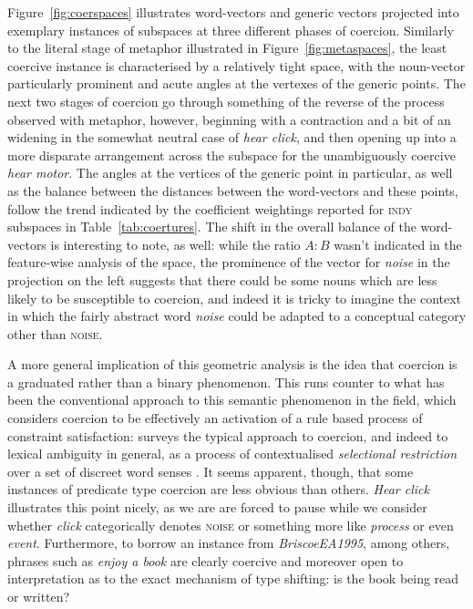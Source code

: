 Figure~\ref{fig:coerspaces} illustrates word-vectors and generic vectors projected into exemplary instances of subspaces at three different phases of coercion.  Similarly to the literal stage of metaphor illustrated in Figure~\ref{fig:metaspaces}, the least coercive instance is characterised by a relatively tight space, with the noun-vector particularly prominent and acute angles at the vertexes of the generic points.  The next two stages of coercion go through something of the reverse of the process observed with metaphor, however, beginning with a contraction and a bit of an widening in the somewhat neutral case of \emph{hear click}, and then opening up into a more disparate arrangement across the subspace for the unambiguously coercive \emph{hear motor}.  The angles at the vertices of the generic point in particular, as well as the balance between the distances between the word-vectors and these points, follow the trend indicated by the coefficient weightings reported for \textsc{indy} subspaces in Table~\ref{tab:coertures}.  The shift in the overall balance of the word-vectors is interesting to note, as well: while the ratio $A:B$ wasn't indicated in the feature-wise analysis of the space, the prominence of the vector for \emph{noise} in the projection on the left suggests that there could be some nouns which are less likely to be susceptible to coercion, and indeed it is tricky to imagine the context in which the fairly abstract word \emph{noise} could be adapted to a conceptual category other than \textsc{noise}.

A more general implication of this geometric analysis is the idea that coercion is a graduated rather than a binary phenomenon.  This runs counter to what has been the conventional approach to this semantic phenomenon in the field, which considers coercion to be effectively an activation of a rule based process of constraint satisfaction: \cite{Pustejovsky1993} surveys the typical approach to coercion, and indeed to lexical ambiguity in general, as a process of contextualised \emph{selectional restriction} over a set of discreet word senses \citep[though see][for computational applications of a probabilistic, corpus based model]{LapataEA2003,ShutovaEA2013b}.  It seems apparent, though, that some instances of predicate type coercion are less obvious than others.  \emph{Hear click} illustrates this point nicely, as we are are forced to pause while we consider whether \emph{click} categorically denotes \textsc{noise} or something more like \emph{process} or even \emph{event}.  Furthermore, to borrow an instance from \emph{BriscoeEA1995}, among others, phrases such as \emph{enjoy a book} are clearly coercive and moreover open to interpretation as to the exact mechanism of type shifting: is the book being read or written?

